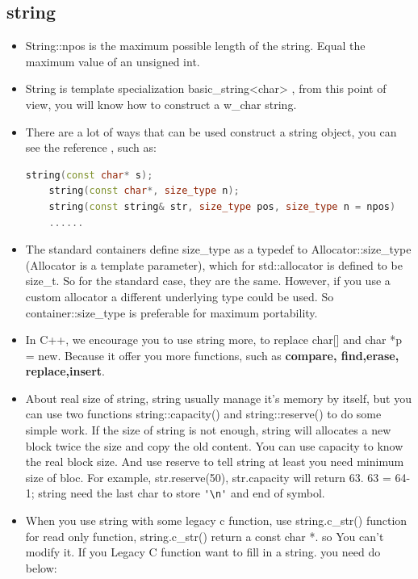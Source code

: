 \documentclass[a4paper,11pt,twoside]{book}
\begin{document}
\subsection{string}
\begin{itemize}
	\item String::npos is the maximum possible length of the string. Equal the maximum value of an unsigned int.
	\item String is template specialization basic\_string<char> , from this point of view, you will know how to construct a w\_char string.
	\item There are a lot of ways that can be used construct a string object, you can see the reference , such as:
	\begin{lstlisting}[frame=single, language=c++]
	string(const char* s);
	string(const char*, size_type n);
	string(const string& str, size_type pos, size_type n = npos)
	......
	\end{lstlisting}
	
	\item The standard containers define size\_type as a typedef to Allocator::size\_type (Allocator is a template parameter), which for std::allocator is defined to be size\_t. So for the standard case, they are the same. However, if you use a custom allocator a different underlying type could be used. So container::size\_type is preferable for maximum portability.
	
	\item In C++, we encourage you to use string more, to replace char[] and char *p = new.  Because it offer you more functions, such as\textbf{ compare, find,erase, replace,insert}.
	
	\item About real size of string, string usually manage it's memory by itself, but you can use two functions string::capacity() and string::reserve() to do some simple work. If the size of string is not enough, string will allocates a new block twice the size and copy the old content. You can use capacity to know the real block size. And use reserve to tell string at least you need minimum size of bloc. For example, str.reserve(50),  str.capacity will return 63. 63 = 64-1; string need the last char to store \verb='\n'= and end of symbol.
	
	\item When you use string with some legacy c function, use string.c\_str() function for read only function, string.c\_str() return a const char *. so You can't modify it. If you Legacy C function want to fill in a string. you need do below:
	

\end{itemize}
\end{document}

